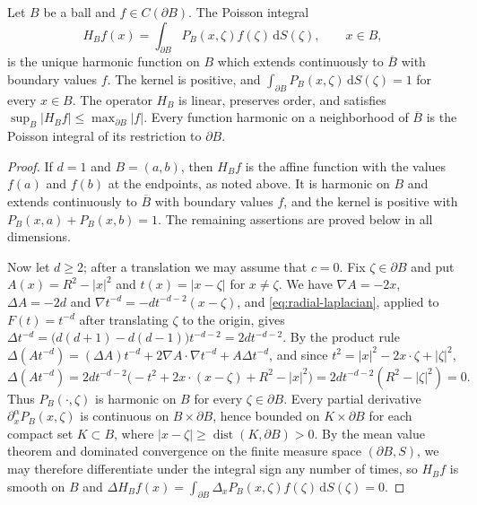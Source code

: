 \begin{theorem}\label{thm:ball-dirichlet}
Let $B$ be a ball and $f\in C(\partial B)$. The Poisson integral
\[
 H_Bf(x)=\int_{\partial B}P_B(x,\zeta)f(\zeta)\,\mathrm d S(\zeta),\qquad x\in B,
\]
is the unique harmonic function on $B$ which extends continuously to $\overline B$ with boundary values $f$. The kernel is positive, and $\int_{\partial B}P_B(x,\zeta)\,\mathrm dS(\zeta)=1$ for every $x\in B$. The operator $H_B$ is linear, preserves order, and satisfies $\sup_B|H_Bf|\leq\max_{\partial B}|f|$. Every function harmonic on a neighborhood of $\overline B$ is the Poisson integral of its restriction to $\partial B$.
\end{theorem}
\begin{proof}
If $d=1$ and $B=(a,b)$, then $H_Bf$ is the affine function with the values $f(a)$ and $f(b)$ at the endpoints, as noted above. It is harmonic on $B$ and extends continuously to $\overline B$ with boundary values $f$, and the kernel is positive with $P_B(x,a)+P_B(x,b)=1$. The remaining assertions are proved below in all dimensions.

Now let $d\geq2$; after a translation we may assume that $c=0$. Fix $\zeta\in\partial B$ and put $A(x)=R^2-|x|^2$ and $t(x)=|x-\zeta|$ for $x\neq\zeta$. We have $\nabla A=-2x$, $\Delta A=-2d$ and $\nabla t^{-d}=-dt^{-d-2}(x-\zeta)$, and \eqref{eq:radial-laplacian}, applied to $F(t)=t^{-d}$ after translating $\zeta$ to the origin, gives $\Delta t^{-d}=\bigl(d(d+1)-d(d-1)\bigr)t^{-d-2}=2dt^{-d-2}$. By the product rule $\Delta(At^{-d})=(\Delta A)t^{-d}+2\nabla A\cdot\nabla t^{-d}+A\Delta t^{-d}$, and since $t^2=|x|^2-2x\cdot\zeta+|\zeta|^2$,
\[
 \Delta(At^{-d})=2dt^{-d-2}\bigl(-t^2+2x\cdot(x-\zeta)+R^2-|x|^2\bigr)=2dt^{-d-2}(R^2-|\zeta|^2)=0.
\]
Thus $P_B(\cdot,\zeta)$ is harmonic on $B$ for every $\zeta\in\partial B$. Every partial derivative $\partial_x^\alpha P_B(x,\zeta)$ is continuous on $B\times\partial B$, hence bounded on $K\times\partial B$ for each compact set $K\subset B$, where $|x-\zeta|\geq\operatorname{dist}(K,\partial B)>0$. By the mean value theorem and dominated convergence on the finite measure space $(\partial B,S)$, we may therefore differentiate under the integral sign any number of times, so $H_Bf$ is smooth on $B$ and $\Delta H_Bf(x)=\int_{\partial B}\Delta_xP_B(x,\zeta)f(\zeta)\,\mathrm dS(\zeta)=0$.


\end{proof}

